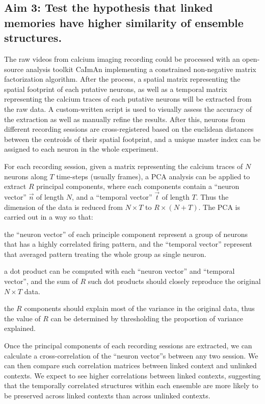 \documentclass[master.tex]{subfiles}
\begin{document}
\subsection*{Aim 3: Test the hypothesis that linked memories have higher
  similarity of ensemble structures.}
The raw videos from calcium imaging recording could be processed with an
open-source analysis toolkit CaImAn implementing a constrained non-negative
matrix factorization algorithm. After the process, a spatial matrix representing
the spatial footprint of each putative neurons, as well as a temporal matrix
representing the calcium traces of each putative neurons will be extracted from
the raw data. A custom-written script is used to visually assess the accuracy of
the extraction as well as manually refine the results. After this, neurons from
different recording sessions are cross-registered based on the euclidean
distances between the centroids of their spatial footprint, and a unique master
index can be assigned to each neuron in the whole experiment.

For each recording session, given a matrix representing the calcium traces of
$N$ neurons along $T$ time-steps (usually frames), a PCA analysis can be applied
to extract $R$ principal components, where each components contain a ``neuron
vector'' $\vec{n}$ of length $N$, and a ``temporal vector'' $\vec{t}$ of length
$T$. Thus the dimension of the data is reduced from $N \times T$ to $R \times (N
+ T)$. The PCA is carried out in a way so that:
\begin{inparaenum}[a)]
\item the ``neuron vector'' of each principle component represent a group of
  neurons that has a highly correlated firing pattern, and the ``temporal
  vector'' represent that averaged pattern treating the whole group as single
  neuron.
\item a dot product can be computed with each ``neuron vector'' and ``temporal
  vector'', and the sum of $R$ such dot products should closely reproduce the
  original $N \times T$ data.
\item the $R$ components should explain most of the variance in the original
  data, thus the value of $R$ can be determined by thresholding the proportion
  of variance explained.
\end{inparaenum}

Once the principal components of each recording sessions are extracted, we can
calculate a cross-correlation of the ``neuron vector''s between any two session.
We can then compare such correlation matrices between linked context and
unlinked contexts. We expect to see higher correlations between linked contexts,
suggesting that the temporally correlated structures within each ensemble are
more likely to be preserved across linked contexts than across unlinked
contexts.
\end{document}
